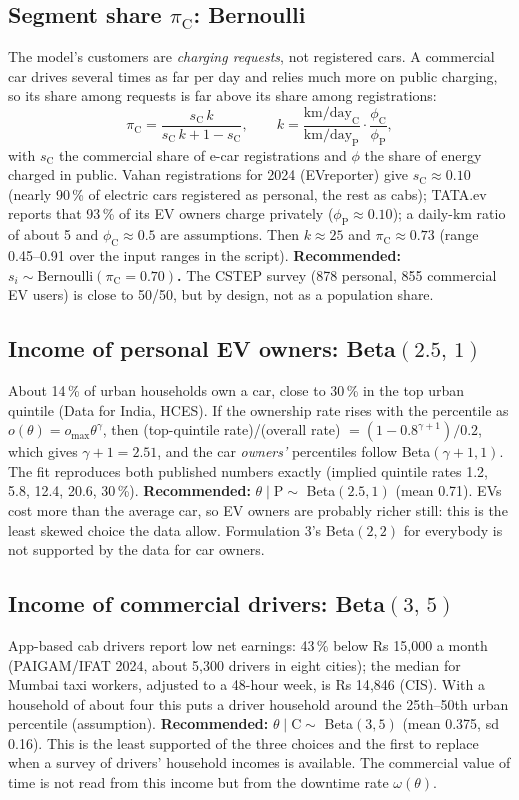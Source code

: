 \documentclass[12pt,a4paper]{article}
\begin{document}
\subsection*{Segment share $\pi_{\mathrm C}$: Bernoulli}
The model's customers are \emph{charging requests}, not registered cars. A commercial car drives several times as far per day and relies much more on public charging, so its share among requests is far above its share among registrations:
\[
\pi_{\mathrm C}=\frac{s_{\mathrm C}\,k}{s_{\mathrm C}\,k+1-s_{\mathrm C}},\qquad k=\frac{\text{km/day}_{\mathrm C}}{\text{km/day}_{\mathrm P}}\cdot\frac{\phi_{\mathrm C}}{\phi_{\mathrm P}} ,
\]
with $s_{\mathrm C}$ the commercial share of e-car registrations and $\phi$ the share of energy charged in public. Vahan registrations for 2024 (EVreporter) give $s_{\mathrm C}\approx0.10$ (nearly 90\,\% of electric cars registered as personal, the rest as cabs); TATA.ev reports that 93\,\% of its EV owners charge privately ($\phi_{\mathrm P}\approx0.10$); a daily-km ratio of about 5 and $\phi_{\mathrm C}\approx0.5$ are assumptions. Then $k\approx25$ and $\pi_{\mathrm C}\approx0.73$ (range 0.45--0.91 over the input ranges in the script). \textbf{Recommended: $s_i\sim\text{Bernoulli}(\pi_{\mathrm C}=0.70)$.} The CSTEP survey (878 personal, 855 commercial EV users) is close to 50/50, but by design, not as a population share.

\subsection*{Income of personal EV owners: Beta$(2.5,\,1)$}
About 14\,\% of urban households own a car, close to 30\,\% in the top urban quintile (Data for India, HCES). If the ownership rate rises with the percentile as $o(\theta)=o_{\max}\theta^{\gamma}$, then (top-quintile rate)/(overall rate) $=(1-0.8^{\gamma+1})/0.2$, which gives $\gamma+1=2.51$, and the car \emph{owners'} percentiles follow Beta$(\gamma+1,1)$. The fit reproduces both published numbers exactly (implied quintile rates 1.2, 5.8, 12.4, 20.6, 30\,\%). \textbf{Recommended:} $\theta\mid\mathrm P\sim$ Beta$(2.5,1)$ (mean 0.71). EVs cost more than the average car, so EV owners are probably richer still: this is the least skewed choice the data allow. Formulation 3's Beta$(2,2)$ for everybody is not supported by the data for car owners.

\subsection*{Income of commercial drivers: Beta$(3,\,5)$}
App-based cab drivers report low net earnings: 43\,\% below Rs 15{,}000 a month (PAIGAM/IFAT 2024, about 5{,}300 drivers in eight cities); the median for Mumbai taxi workers, adjusted to a 48-hour week, is Rs 14{,}846 (CIS). With a household of about four this puts a driver household around the 25th--50th urban percentile (assumption). \textbf{Recommended:} $\theta\mid\mathrm C\sim$ Beta$(3,5)$ (mean 0.375, sd 0.16). This is the least supported of the three choices and the first to replace when a survey of drivers' household incomes is available. The commercial value of time is not read from this income but from the downtime rate $\omega(\theta)$.
\end{document}
